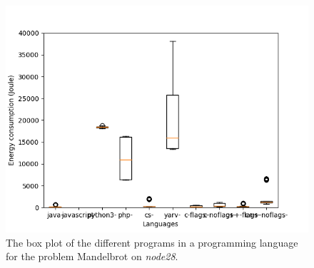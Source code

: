 \begin{appendices}
\begin{figure}[h]
    \centering
    \includegraphics[width=.6\textwidth]{graphs/mandelbrot_BOXoverview3.png}
    \caption{The box plot of the different programs in a programming language for the problem Mandelbrot on \textit{node28}.}
    \label{fig:box-mandelbrot3}
\end{figure}

\begin{table}[h]
\centering
{}
\caption{The comparison of the different languages for the Mandelbrot problem on \textit{node28}. A \textit{+} means that the language on the row has a lower energy consumption then the language on the column, the opposite for \textit{-}, and the \textit{Unknown} means that we could not reject the null hypothesis.}
\label{tab:lang-mandelbrot3}
\end{table}


\end{appendices}
